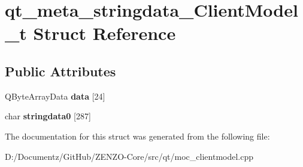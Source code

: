 \hypertarget{structqt__meta__stringdata___client_model__t}{}\section{qt\+\_\+meta\+\_\+stringdata\+\_\+\+Client\+Model\+\_\+t Struct Reference}
\label{structqt__meta__stringdata___client_model__t}
\subsection*{Public Attributes}
\begin{DoxyCompactItemize}
\item 
\mbox{\label{structqt__meta__stringdata___client_model__t_a3d759f93540557051c8f7a94b79f3c2e}} 
Q\+Byte\+Array\+Data {\bfseries data} \mbox{[}24\mbox{]}
\item 
\mbox{\label{structqt__meta__stringdata___client_model__t_a46aaacf15b60b352d7c447c47bd99a23}} 
char {\bfseries stringdata0} \mbox{[}287\mbox{]}
\end{DoxyCompactItemize}


The documentation for this struct was generated from the following file\+:\begin{DoxyCompactItemize}
\item 
D\+:/\+Documentz/\+Git\+Hub/\+Z\+E\+N\+Z\+O-\/\+Core/src/qt/moc\+\_\+clientmodel.\+cpp\end{DoxyCompactItemize}

